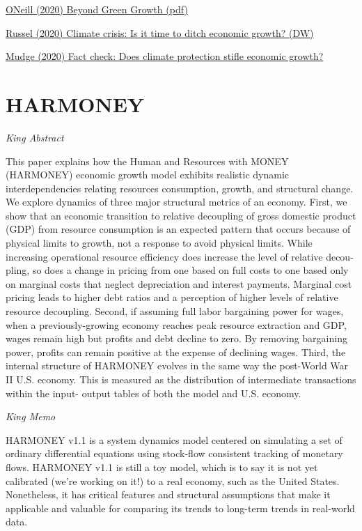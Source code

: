 \documentclass[
]{book}
\begin{document}
\href{pdf/ONeill_2020_Beyond_Green_Growth.pdf}{ONeill (2020) Beyond Green Growth (pdf)}

\href{https://www.dw.com/en/climatechange-emissions-fossilfuels-gdp-economy-renewables/a-55089013}{Russel (2020) Climate crisis: Is it time to ditch economic growth? (DW)}

\href{https://www.dw.com/en/fact-check-does-climate-protection-stifle-economic-growth/a-58104531}{Mudge (2020) Fact check: Does climate protection stifle economic growth?}

\hypertarget{harmoney}{%
\section{HARMONEY}\label{harmoney}}

\emph{King Abstract}

This paper explains how the Human and Resources with MONEY (HARMONEY) economic growth model exhibits realistic
dynamic interdependencies relating resources consumption, growth, and structural change. We explore dynamics of three
major structural metrics of an economy. First, we show that an economic transition to relative decoupling of gross domestic
product (GDP) from resource consumption is an expected pattern that occurs because of physical limits to growth, not a
response to avoid physical limits. While increasing operational resource efficiency does increase the level of relative decou-
pling, so does a change in pricing from one based on full costs to one based only on marginal costs that neglect depreciation
and interest payments. Marginal cost pricing leads to higher debt ratios and a perception of higher levels of relative resource
decoupling. Second, if assuming full labor bargaining power for wages, when a previously-growing economy reaches peak
resource extraction and GDP, wages remain high but profits and debt decline to zero. By removing bargaining power, profits
can remain positive at the expense of declining wages. Third, the internal structure of HARMONEY evolves in the same
way the post-World War II U.S. economy. This is measured as the distribution of intermediate transactions within the input-
output tables of both the model and U.S. economy.

\emph{King Memo}

HARMONEY v1.1 is a system dynamics model centered on simulating a set of ordinary differential equations using stock-flow consistent tracking of monetary flows. HARMONEY v1.1 is still a toy model, which is to say it is not yet calibrated (we're working on it!) to a real economy, such as the United States. Nonetheless, it has critical features and structural assumptions that make it applicable and valuable for comparing its trends to long-term trends in real-world data.
\end{document}
